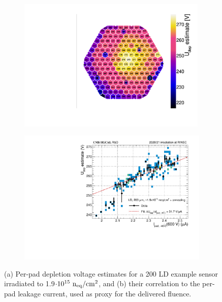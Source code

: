 \begin{figure}
	\captionsetup[subfigure]{aboveskip=-1pt,belowskip=-1pt}
	\centering
	\begin{subfigure}[b]{0.49\textwidth}
		\centering
		\includegraphics[width=0.99\textwidth]{plots/Vdep_hexplots/0541_04.pdf}
		\subcaption{
			}
			\label{plot:Vdep_hexplot_0541_04}
	\end{subfigure}
	\hfill
	\begin{subfigure}[b]{0.49\textwidth}
		\centering
		\includegraphics[width=0.999\textwidth]{plots/Vdep_vs_fluence/Vdep_vs_current_5414.pdf}
		\subcaption{
			}
			\label{plot:Vdep_vs_current_5414}
	\end{subfigure}
	\caption{
		(a) Per-pad depletion voltage estimates for a \SI{200}{\micron} LD example sensor irradiated to 1.9$\cdot 10^{15}~\mathrm{n_{eq}}/\mathrm{cm}^{2}$, and 
		(b) their correlation to the per-pad leakage current, used as proxy for the delivered fluence.
	}
\end{figure}
